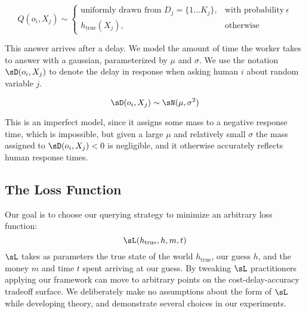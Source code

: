 \begin{equation}
    Q(o_i, X_j) \sim
    \begin{cases}
       \text{uniformly drawn from } D_j = \{1 \ldots K_j\}, & \text{with probability}\ \epsilon \\
      h_{\text{true}}(X_j), & \text{otherwise}
    \end{cases}
 \end{equation}
 
This answer arrives after a delay.
 We model the amount of time the worker takes to answer with a gaussian, parameterized by $\mu$ and $\sigma$.
 We use the notation $\sD(o_i, X_j)$ to denote the delay in response when asking human $i$ about random variable $j$.

\[\sD(o_i, X_j) \sim \sN(\mu, \sigma^2)\]

This is an imperfect model, since it assigns some mass to a negative response time, which is impossible, but given a large $\mu$ and relatively small $\sigma$ the mass assigned to $\sD(o_i, X_j) < 0$ is negligible, and it otherwise accurately reflects human response times.

\subsection{The Loss Function}

Our goal is to choose our querying strategy to minimize an arbitrary loss function:
\[\sL(h_{\text{true}}, h, m, t)\]
$\sL$ takes as parameters the true state of the world $h_{\text{true}}$, our guess $h$, and the money $m$ and time $t$ spent arriving at our guess.
 By tweaking $\sL$ practitioners applying our framework can move to arbitrary points on the cost-delay-accuracy tradeoff surface.
 We deliberately make no assumptions about the form of $\sL$ while developing theory, and demonstrate several choices in our experiments.





